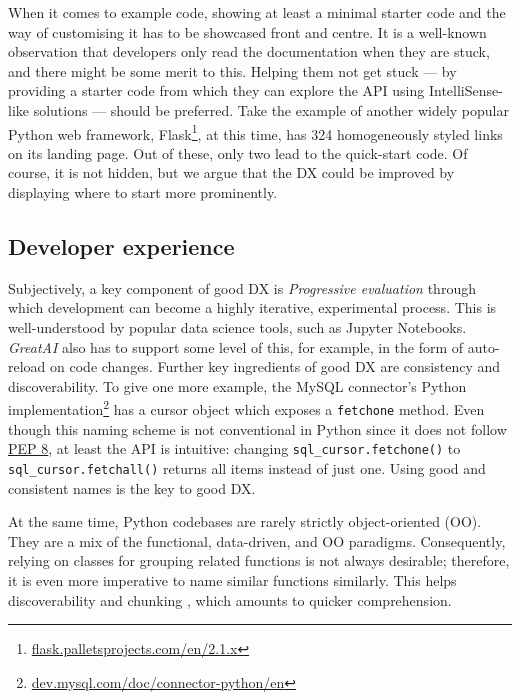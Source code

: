 When it comes to example code, showing at least a minimal starter code and the way of customising it has to be showcased front and centre. It is a well-known observation that developers only read the documentation when they are stuck, and there might be some merit to this. Helping them not get stuck --- by providing a starter code from which they can explore the API using IntelliSense-like solutions --- should be preferred. Take the example of another widely popular Python web framework, Flask\footnote{\href{https://flask.palletsprojects.com/en/2.1.x/}{flask.palletsprojects.com/en/2.1.x}}, at this time, has 324 homogeneously styled links on its landing page. Out of these, only two lead to the quick-start code. Of course, it is not hidden, but we argue that the DX could be improved by displaying where to start more prominently.

\subsection{Developer experience}

Subjectively, a key component of good DX is \textit{Progressive evaluation} through which development can become a highly iterative, experimental process. This is well-understood by popular data science tools, such as Jupyter Notebooks. \textit{GreatAI} also has to support some level of this, for example, in the form of auto-reload on code changes. Further key ingredients of good DX are consistency and discoverability. To give one more example, the MySQL connector's Python implementation\footnote{\href{https://dev.mysql.com/doc/connector-python/en/}{dev.mysql.com/doc/connector-python/en}} has a cursor object which exposes a \texttt{fetchone} method. Even though this naming scheme is not conventional in Python since it does not follow \href{https://peps.python.org/pep-0008/}{PEP 8}, at least the API is intuitive: changing \texttt{sql\_cursor.fetchone()} to \texttt{sql\_cursor.fetchall()} returns all items instead of just one. Using good and consistent names is the key to good DX.

At the same time, Python codebases are rarely strictly object-oriented (OO). They are a mix of the functional, data-driven, and OO paradigms. Consequently, relying on classes for grouping related functions is not always desirable; therefore, it is even more imperative to name similar functions similarly. This helps discoverability and chunking \cite{hermans2021programmer}, which amounts to quicker comprehension.


